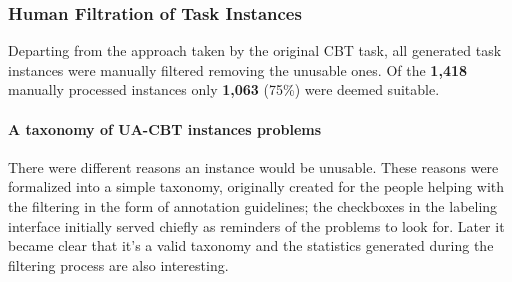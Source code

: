 \subsubsection{Human Filtration of Task Instances}
\label{sec:human}
Departing from the approach taken by the original CBT task, all generated task instances were manually filtered removing the unusable ones.
Of the \textbf{1,418} manually processed instances only 
\textbf{1,063} (75\%) were deemed suitable.

\paragraph{A taxonomy of UA-CBT instances problems}
There were different reasons an instance would be unusable.
These reasons were formalized into a simple taxonomy, 
originally created for the people helping with the filtering in the form
of annotation guidelines; the checkboxes in the labeling interface
initially served chiefly as reminders of the problems to look for. 
Later it became clear that it's a valid taxonomy and the statistics generated during the filtering process are also interesting.

